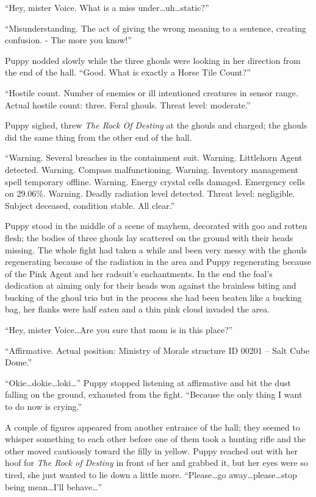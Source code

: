 ``Hey, mister Voice. What is a miss under\dots uh\dots static?''

``{\mt Misunderstanding. The act of giving the wrong meaning to a sentence, creating confusion. - The more you know!}''

Puppy nodded slowly while the three ghouls were looking in her direction from the end of the hall. ``Good. What is exactly a Horse Tile Count?''

``{\mt Hostile count. Number of enemies or ill intentioned creatures in sensor range. Actual hostile count: three. Feral ghouls. Threat level: moderate.}''

Puppy sighed, threw \emph{The Rock Of Destiny} at the ghouls and charged; the ghouls did the same thing from the other end of the hall.

\horizonline


``{\mt Warning. Several breaches in the containment suit. Warning. Littlehorn Agent detected. Warning. Compass malfunctioning. Warning. Inventory management spell temporary offline. Warning. Energy crystal cells damaged. Emergency cells on 29.06\%. Warning. Deadly radiation level detected. Threat level: negligible. Subject deceased, condition stable. All clear.}''

Puppy stood in the middle of a scene of mayhem, decorated with goo and rotten flesh; the bodies of three ghouls lay scattered on the ground with their heads missing. The whole fight had taken a while and been very messy with the ghouls regenerating because of the radiation in the area and Puppy regenerating because of the Pink Agent and her radsuit's enchantments. In the end the foal's dedication at aiming only for their heads won against the brainless biting and bucking of the ghoul trio but in the process she had been beaten like a bucking bag, her flanks were half eaten and a thin pink cloud invaded the area.

``Hey, mister Voice\dots Are you sure that mom is in this place?''

``{\mt Affirmative. Actual position: Ministry of Morale structure ID 00201 -- Salt Cube Dome.}''

``Okie\dots dokie\dots loki\dots'' Puppy stopped listening at affirmative and bit the dust falling on the ground, exhausted from the fight. ``Because the only thing I want to do now is crying.''

A couple of figures appeared from another entrance of the hall; they seemed to whisper something to each other before one of them took a hunting rifle and the other moved cautiously toward the filly in yellow. Puppy reached out with her hoof for \emph{The Rock of Destiny} in front of her and grabbed it, but her eyes were so tired, she just wanted to lie down a little more. ``Please\dots go away\dots please\dots stop being mean\dots I'll behave\dots''


